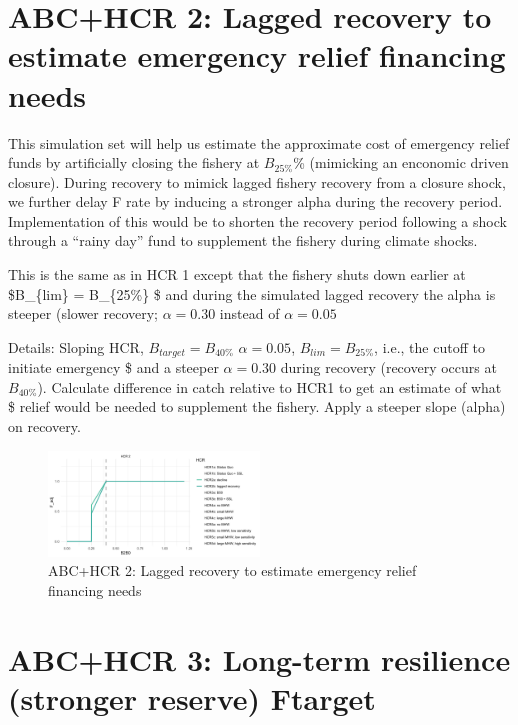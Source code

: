 \documentclass[
]{article}
\begin{document}
\section{ABC+HCR 2: Lagged recovery to estimate emergency relief
financing
needs}\label{abchcr-2-lagged-recovery-to-estimate-emergency-relief-financing-needs}

This simulation set will help us estimate the approximate cost of
emergency relief funds by artificially closing the fishery at
\(B_{25\%}\)\% (mimicking an enconomic driven closure). During recovery
to mimick lagged fishery recovery from a closure shock, we further delay
F rate by inducing a stronger alpha during the recovery period.
Implementation of this would be to shorten the recovery period following
a shock through a ``rainy day'' fund to supplement the fishery during
climate shocks.

This is the same as in HCR 1 except that the fishery shuts down earlier
at \$B\_\{lim\} = B\_\{25\%\} \$ and during the simulated lagged
recovery the alpha is steeper (slower recovery; \(\alpha = 0.30\)
instead of \(\alpha = 0.05\)

Details: Sloping HCR, \(B_{target} = B_{40\%}\) \(\alpha = 0.05\),
\(B_{lim} = B_{25\%}\), i.e., the cutoff to initiate emergency \$ and a
steeper \(\alpha = 0.30\) during recovery (recovery occurs at
\(B_{40\%}\)). Calculate difference in catch relative to HCR1 to get an
estimate of what \$ relief would be needed to supplement the fishery.
Apply a steeper slope (alpha) on recovery.

\begin{figure}
\centering
\includegraphics[width=0.5\textwidth,height=\textheight]{../../Figs/HCR_figs/HCR2.png}
\caption{ABC+HCR 2: Lagged recovery to estimate emergency relief
financing needs}
\end{figure}

\section{ABC+HCR 3: Long-term resilience (stronger reserve)
Ftarget}\label{abchcr-3-long-term-resilience-stronger-reserve-ftarget}
\end{document}
